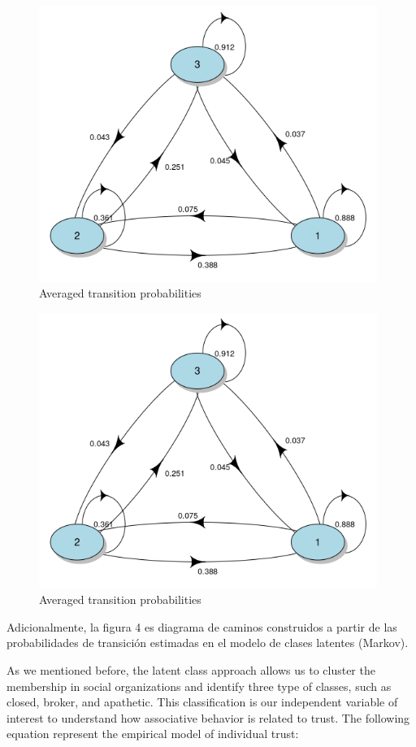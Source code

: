 \begin{figure}[htp]
    \centering
    \includegraphics[width=11cm]{output/plot_transition.png}
    \caption{Averaged transition probabilities}
        \label{fig:trans}
\end{figure}

\begin{figure}[htp]
    \centering
    \includegraphics[width=11cm]{output/plot_transition.png}
    \caption{Averaged transition probabilities}
        \label{fig:trans}
\end{figure}

\hfill

Adicionalmente, la figura 4 es diagrama de caminos construidos a partir de las probabilidades de transición estimadas en el modelo de clases latentes (Markov). 


As we mentioned before, the latent class approach allows us to cluster the membership in social organizations and identify three type of classes, such as closed, broker, and apathetic. This classification is our independent variable of interest to understand how associative behavior is related to trust. The following equation represent the empirical model of individual trust:

